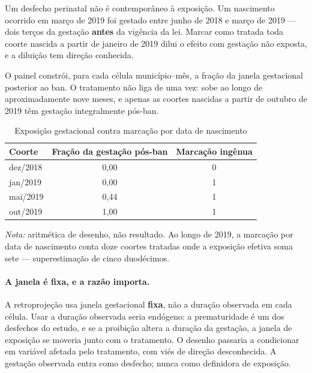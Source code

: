 Um desfecho perinatal não é contemporâneo à exposição. Um nascimento ocorrido em
março de 2019 foi gestado entre junho de 2018 e março de 2019 --- dois terços da
gestação \textbf{antes} da vigência da lei. Marcar como tratada toda coorte
nascida a partir de janeiro de 2019 dilui o efeito com gestação não exposta, e a
diluição tem direção conhecida.

O painel constrói, para cada célula município--mês, a fração da janela
gestacional posterior ao ban. O tratamento não liga de uma vez: sobe ao longo de
aproximadamente nove meses, e apenas as coortes nascidas a partir de outubro de
2019 têm gestação integralmente pós-ban.

\begin{table}[htbp]
\centering
\caption{Exposição gestacional contra marcação por data de nascimento}
\label{tab:exposicao}
\begin{tabular}{lcc}
\hline
Coorte & Fração da gestação pós-ban & Marcação ingênua \\
\hline
dez/2018 & 0{,}00 & 0 \\
jan/2019 & 0{,}00 & 1 \\
mai/2019 & 0{,}44 & 1 \\
out/2019 & 1{,}00 & 1 \\
\hline
\end{tabular}

\vspace{0.5em}
\begin{minipage}{0.9\textwidth}
\footnotesize \emph{Nota:} aritmética de desenho, não resultado. Ao longo de
2019, a marcação por data de nascimento conta doze coortes tratadas onde a
exposição efetiva soma sete --- superestimação de cinco duodécimos.
\end{minipage}
\end{table}

\paragraph{A janela é fixa, e a razão importa.} A retroprojeção usa janela
gestacional \textbf{fixa}, não a duração observada em cada célula. Usar a duração
observada seria endógeno: a prematuridade é um dos desfechos do estudo, e se a
proibição altera a duração da gestação, a janela de exposição se moveria junto
com o tratamento. O desenho passaria a condicionar em variável afetada pelo
tratamento, com viés de direção desconhecida. A gestação observada entra como
desfecho; nunca como definidora de exposição.

